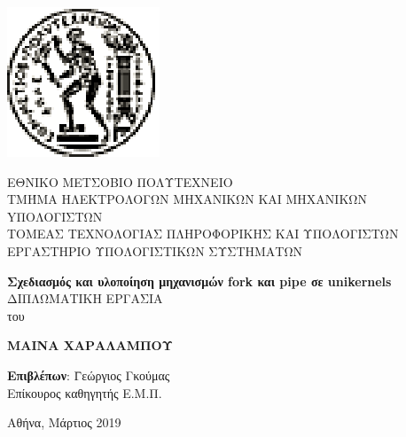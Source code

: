 \documentclass[12pt, twoside, a4paper]{report}
\begin{document}
\addtolength{\topmargin}{-0.5in}
\thispagestyle{empty}
\vspace{-8ex}
\begin{center}
\includegraphics[scale=1]{figures/pyrforos.eps}
\end{center}
\begin{center}
\Large{Ε}\large{ΘΝΙΚO}
\Large{Μ}\large{ΕΤΣOΒΙΟ}
\Large{Π}\large{ΟΛΥΤΕΧΝΕIΟ} \\
\normalsize{Τ}\small{ΜΉΜΑ}
\normalsize{H}\small{ΛΕΚΤΡΟΛΟΓΩΝ}
\normalsize{M}\small{ΗΧΑΝΙΚΩΝ}
\normalsize{K}\small{AI}
\normalsize{M}\small{ΗΧΑΝΙΚΩΝ}
\normalsize{Y}\small{ΠΟΛΟΓΙΣΤΩΝ} \\
\vspace{2ex}
ΤΟΜΕΑΣ ΤΕΧΝΟΛΟΓΙΑΣ ΠΛΗΡΟΦΟΡΙΚΗΣ ΚΑΙ ΥΠΟΛΟΓΙΣΤΩΝ \\
ΕΡΓΑΣΤΗΡΙΟ ΥΠΟΛΟΓΙΣΤΙΚΩΝ ΣΥΣΤΗΜΑΤΩΝ \\
\end{center}
\begin{center}
\vspace{8ex}
\large \textbf{Σχεδιασμός και υλοποίηση μηχανισμών fork και pipe σε unikernels} \\
\vspace{10ex}
\large
ΔΙΠΛΩΜΑΤΙΚΗ ΕΡΓΑΣΙΑ\\
\vspace{2ex}
\normalsize
του \\
\end{center}
\vspace{2ex}
\begin{center}
\center\textbf{
ΜΑΙΝΑ ΧΑΡΑΛΑΜΠΟΥ}
\vspace{10ex}
\end{center}
\begin{tabbing}
	\textbf{Επιβλέπων}: \= Γεώργιος Γκούμας \\
			    \> Επίκουρος καθηγητής Ε.Μ.Π.
\end{tabbing}
\begin{center}
\normalsize
Αθήνα, Μάρτιος 2019
\end{center}
\end{document}
